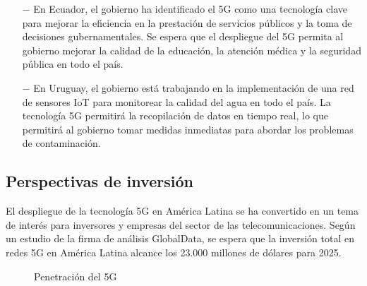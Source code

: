 \documentclass[12pt]{article}
\begin{document}
\begin{itemize}
                \item [$-$] En Ecuador, el gobierno ha identificado el 5G como una tecnología clave para mejorar la eficiencia en la prestación de servicios públicos y la toma de decisiones gubernamentales. Se espera que el despliegue del 5G permita al gobierno mejorar la calidad de la educación, la atención médica y la seguridad pública en todo el país.
                
                \item [$-$] En Uruguay, el gobierno está trabajando en la implementación de una red de sensores IoT para monitorear la calidad del agua en todo el país. La tecnología 5G permitirá la recopilación de datos en tiempo real, lo que permitirá al gobierno tomar medidas inmediatas para abordar los problemas de contaminación.
            \end{itemize}
            

        \subsection{Perspectivas de inversión}

            El despliegue de la tecnología 5G en América Latina se ha convertido en un tema de interés para inversores y empresas del sector de las telecomunicaciones. Según un estudio de la firma de análisis GlobalData, se espera que la inversión total en redes 5G en América Latina alcance los 23.000 millones de dólares para 2025.

            \begin{figure}[!h]
                \centering
                \caption{Penetración del 5G}
                \label{fig:penetracion5G}
            \end{figure}
\end{document}
